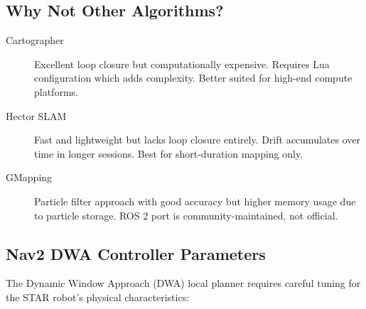\documentclass[11pt,letterpaper]{article}
\begin{document}
\subsection{Why Not Other Algorithms?}

\begin{description}
    \item[Cartographer] Excellent loop closure but computationally expensive. Requires Lua configuration which adds complexity. Better suited for high-end compute platforms.

    \item[Hector SLAM] Fast and lightweight but lacks loop closure entirely. Drift accumulates over time in longer sessions. Best for short-duration mapping only.

    \item[GMapping] Particle filter approach with good accuracy but higher memory usage due to particle storage. ROS 2 port is community-maintained, not official.
\end{description}

\subsection{Nav2 DWA Controller Parameters}

The Dynamic Window Approach (DWA) local planner requires careful tuning for the STAR robot's physical characteristics:
\end{document}

